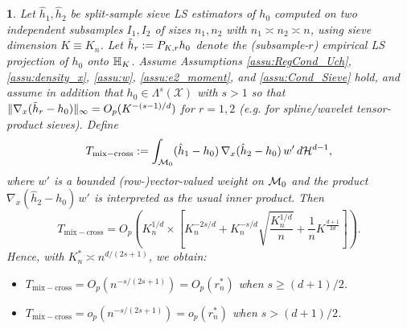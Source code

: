 \documentclass[12pt,american]{article}
\newcommand{\cH}{\mathcal{H}}
\theoremstyle{definition}
\theoremstyle{plain}
\theoremstyle{definition}
\theoremstyle{plain}
\newtheorem{lem}{\protect\lemmaname}
\theoremstyle{plain}
\theoremstyle{plain}
\theoremstyle{plain}
\theoremstyle{plain}
\providecommand{\lemmaname}{Lemma}
\providecommand{\lemmaname}{Lemma}
\begin{document}
\begin{lem}\label{lem:Uch_SS-cross}
Let $\hat{h}_1,\hat{h}_2$ be split-sample sieve LS estimators of $h_0$ computed on two independent subsamples
$I_1,I_2$ of sizes $n_1,n_2$ with $n_1\asymp n_2\asymp n$, using sieve dimension $K\equiv K_n$.
Let $\tilde{h}_r:=P_{K,r}h_0$ denote the (subsample-$r$) empirical LS projection of $h_0$ onto ${\mathbb{H}}_{K}$.
Assume Assumptions \ref{assu:RegCond_Uch}, \ref{assu:density_x}, \ref{assu:w}, \ref{assu:e2_moment}, and \ref{assu:Cond_Sieve} hold,
and assume in addition that $h_0\in\Lambda^s(\mathcal X)$ with $s>1$ so that
$\|\nabla_x(\tilde{h}_r-h_0)\|_\infty=O_p(K^{-(s-1)/d})$ for $r=1,2$ (e.g. for spline/wavelet tensor-product sieves).
Define
\[
T_{\mathrm{mix-cross}}
:=\int_{\cM_0}(\hat h_1-h_0)\,\nabla_x(\hat h_2-h_0)\,w'\,d\cH^{d-1},
\]
where $w'$ is a bounded (row-)vector-valued weight on $\mathcal{M}_0$ and the product $\nabla_x(\hat h_2-h_0)\,w'$ is interpreted as the usual inner product.
Then
\[
T_{\mathrm{mix-cross}}=O_p \left(K_n^{1/d}\times\left[K_n^{-2s/d} +K_n^{-s/d}\sqrt{ \frac{K_n^{1/d}}{n}} +\frac{1}{n} K^{\frac{d+1}{2d}}\right]\right).
\]
Hence, with $K^*_n \asymp n^{d/(2s+1)}$, we obtain:
\begin{itemize}
\item[(1)] $T_{\mathrm{mix-cross}}=O_p(n^{-s/(2s+1)})=O_p(r^*_n)$ when $s\geq (d+1)/2$.
\item[(2)]  $T_{\mathrm{mix-cross}}=o_p(n^{-s/(2s+1)})=o_p(r^*_n)$ when $s> (d+1)/2$.
\end{itemize}
\end{lem}
\end{document}
